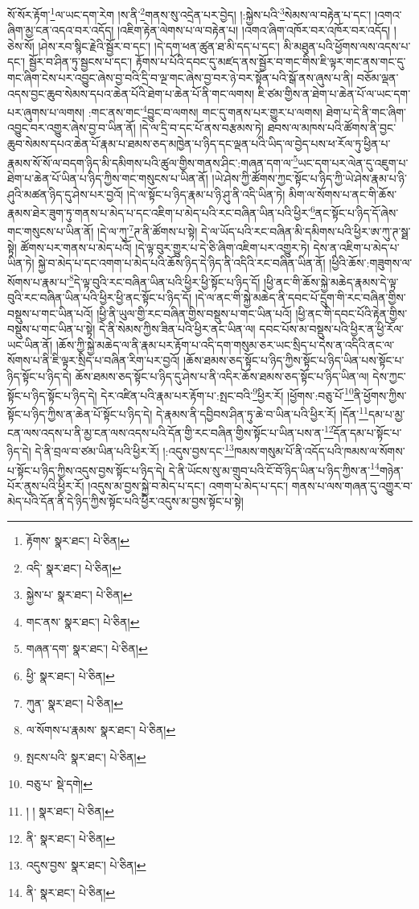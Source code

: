 སོ་སོར་རྟོག་\footnote{རྟོགས་  སྣར་ཐང་།  པེ་ཅིན། }ལ་ཡང་དག་རེག །ས་ནི་\footnote{འདི་  སྣར་ཐང་།  པེ་ཅིན། }གནས་སུ་འདྲེན་པར་བྱེད། །:སྐྱེས་པའི་\footnote{སྐྱེས་པ་  སྣར་ཐང་།  པེ་ཅིན། }སེམས་ལ་བརྟེན་པ་དང་། །འགའ་ཞིག་མྱ་ངན་འདའ་བར་འདོད། །འཇིག་རྟེན་ལེགས་པ་ལ་བརྟེན་པ། །འགའ་ཞིག་འཁོར་བར་འཁོར་བར་འདོད། །ཅེས་སོ། །ཤེས་རབ་སྙིང་རྗེའི་སྦྱོར་བ་དང་། །དེ་དག་ཕན་ཚུན་ཐ་མི་དད་པ་དང་། མི་མཐུན་པའི་ཕྱོགས་ལས་འདས་པ་དང་། སྦྱོར་བ་ཤིན་ཏུ་སྦྱངས་པ་དང་། རྟོགས་པ་པོའི་དབང་དུ་མཛད་ནས་སྦྱོར་བ་གང་གིས་ཇི་ལྟར་གང་ནས་གང་དུ་གང་ཞིག་ངེས་པར་འབྱུང་ཞེས་བྱ་བའི་དྲི་བ་ལྔ་གང་ཞེས་བྱ་བར་ཉེ་བར་སྟོན་པའི་སྒོ་ནས་ཞུས་པ་ནི། བཅོམ་ལྡན་འདས་བྱང་ཆུབ་སེམས་དཔའ་ཆེན་པོའི་ཐེག་པ་ཆེན་པོ་ནི་གང་ལགས། ཇི་ཙམ་གྱིས་ན་ཐེག་པ་ཆེན་པོ་ལ་ཡང་དག་པར་ཞུགས་པ་ལགས། :གང་ནས་གང་\footnote{གང་ནས་  སྣར་ཐང་།  པེ་ཅིན། }བྱུང་བ་ལགས། གང་དུ་གནས་པར་གྱུར་པ་ལགས། ཐེག་པ་དེ་ནི་གང་ཞིག་འབྱུང་བར་འགྱུར་ཞེས་བྱ་བ་ཡིན་ནོ། །དེ་ལ་དྲི་བ་དང་པོ་ནས་བརྩམས་ཏེ། ཐབས་ལ་མཁས་པའི་ཚོགས་ནི་བྱང་ཆུབ་སེམས་དཔའ་ཆེན་པོ་རྣམ་པ་ཐམས་ཅད་མཁྱེན་པ་ཉིད་དང་ལྡན་པའི་ཡིད་ལ་བྱེད་པས་ཕ་རོལ་ཏུ་ཕྱིན་པ་རྣམས་སོ་སོ་ལ་བདག་ཉིད་མི་དམིགས་པའི་ཚུལ་གྱིས་གནས་ཤིང་:གཞན་དག་ལ་\footnote{གཞན་དག་  སྣར་ཐང་།  པེ་ཅིན། }ཡང་དག་པར་ལེན་དུ་འཇུག་པ་ཐེག་པ་ཆེན་པོ་ཡིན་པ་ཉིད་ཀྱིས་གང་གསུངས་པ་ཡིན་ནོ། །ཡེ་ཤེས་ཀྱི་ཚོགས་ཀྱང་སྟོང་པ་ཉིད་ཀྱི་ཡེ་ཤེས་རྣམ་པ་ཉི་ཤུའི་མཚན་ཉིད་དུ་ཤེས་པར་བྱའོ། །དེ་ལ་སྟོང་པ་ཉིད་རྣམ་པ་ཉི་ཤུ་ནི་འདི་ཡིན་ཏེ། མིག་ལ་སོགས་པ་ནང་གི་ཆོས་རྣམས་ཐེར་ཟུག་ཏུ་གནས་པ་མེད་པ་དང་འཇིག་པ་མེད་པའི་རང་བཞིན་ཡིན་པའི་ཕྱིར་\footnote{ཕྱི་  སྣར་ཐང་།  པེ་ཅིན། }ནང་སྟོང་པ་ཉིད་དོ་ཞེས་གང་གསུངས་པ་ཡིན་ནོ། །དེ་ལ་ཀུ་\footnote{ཀུན་  སྣར་ཐང་།  པེ་ཅིན། }ཊ་ནི་ཚོགས་པ་སྟེ། དེ་ལ་ཡོད་པའི་རང་བཞིན་མི་དམིགས་པའི་ཕྱིར་ཨ་ཀུ་ཊ་སྠ་སྟེ། ཚོགས་པར་གནས་པ་མེད་པའོ། །དེ་ལྟ་བུར་གྱུར་པ་དེ་ཅི་ཞིག་འཇིག་པར་འགྱུར་ཏེ། དེས་ན་འཇིག་པ་མེད་པ་ཡིན་ཏེ། སྐྱེ་བ་མེད་པ་དང་འགག་པ་མེད་པའི་ཆོས་ཉིད་དེ་ཉིད་ནི་འདིའི་རང་བཞིན་ཡིན་ནོ། །ཕྱིའི་ཆོས་:གཟུགས་ལ་སོགས་པ་རྣམ་པ་\footnote{ལ་སོགས་པ་རྣམས་  སྣར་ཐང་།  པེ་ཅིན། }དེ་ལྟ་བུའི་རང་བཞིན་ཡིན་པའི་ཕྱིར་ཕྱི་སྟོང་པ་ཉིད་དོ། །ཕྱི་ནང་གི་ཆོས་སྐྱེ་མཆེད་རྣམས་དེ་ལྟ་བུའི་རང་བཞིན་ཡིན་པའི་ཕྱིར་ཕྱི་ནང་སྟོང་པ་ཉིད་དོ། །དེ་ལ་ནང་གི་སྐྱེ་མཆེད་ནི་དབང་པོ་དྲུག་གི་རང་བཞིན་གྱིས་བསྡུས་པ་གང་ཡིན་པའོ། །ཕྱི་ནི་ཡུལ་གྱི་རང་བཞིན་གྱིས་བསྡུས་པ་གང་ཡིན་པའོ། །ཕྱི་ནང་གི་དབང་པོའི་རྟེན་གྱིས་བསྡུས་པ་གང་ཡིན་པ་སྟེ། དེ་ནི་སེམས་ཀྱིས་ཟིན་པའི་ཕྱིར་ནང་ཡིན་ལ། དབང་པོས་མ་བསྡུས་པའི་ཕྱིར་ན་ཕྱི་རོལ་ཡང་ཡིན་ནོ། །ཆོས་ཀྱི་སྐྱེ་མཆེད་ལ་ནི་རྣམ་པར་རྟོག་པ་འདི་དག་གསུམ་ཅར་ཡང་སྲིད་པ་དེས་ན་འདིའི་ནང་ལ་སོགས་པ་ནི་ཇི་ལྟར་སྲིད་པ་བཞིན་རིག་པར་བྱའོ། །ཆོས་ཐམས་ཅད་སྟོང་པ་ཉིད་ཀྱིས་སྟོང་པ་ཉིད་ཡིན་པས་སྟོང་པ་ཉིད་སྟོང་པ་ཉིད་དེ། ཆོས་ཐམས་ཅད་སྟོང་པ་ཉིད་དུ་ཤེས་པ་ནི་འདིར་ཆོས་ཐམས་ཅད་སྟོང་པ་ཉིད་ཡིན་ལ། དེས་ཀྱང་སྟོང་པ་ཉིད་སྟོང་པ་ཉིད་དེ། དེར་འཛིན་པའི་རྣམ་པར་རྟོག་པ་:སྤང་བའི་\footnote{སྤངས་པའི་  སྣར་ཐང་།  པེ་ཅིན། }ཕྱིར་རོ། །ཕྱོགས་:བཅུ་པོ་\footnote{བཅུ་པ་  སྡེ་དགེ། }ནི་ཕྱོགས་ཀྱིས་སྟོང་པ་ཉིད་ཀྱིས་ན་ཆེན་པོ་སྟོང་པ་ཉིད་དེ། དེ་རྣམས་ནི་དབྱིབས་ཤིན་ཏུ་ཆེ་བ་ཡིན་པའི་ཕྱིར་རོ། །དོན་\footnote{། །  སྣར་ཐང་།  པེ་ཅིན། }དམ་པ་མྱ་ངན་ལས་འདས་པ་ནི་མྱ་ངན་ལས་འདས་པའི་དོན་གྱི་རང་བཞིན་གྱིས་སྟོང་པ་ཡིན་པས་ན་\footnote{ནི་  སྣར་ཐང་།  པེ་ཅིན། }དོན་དམ་པ་སྟོང་པ་ཉིད་དེ། དེ་ནི་བྲལ་བ་ཙམ་ཡིན་པའི་ཕྱིར་རོ། །:འདུས་བྱས་དང་\footnote{འདུས་བྱས་  སྣར་ཐང་།  པེ་ཅིན། }ཁམས་གསུམ་པོ་ནི་འདོད་པའི་ཁམས་ལ་སོགས་པ་སྟོང་པ་ཉིད་ཀྱིས་འདུས་བྱས་སྟོང་པ་ཉིད་དེ། དེ་ནི་ཡོངས་སུ་མ་གྲུབ་པའི་ངོ་བོ་ཉིད་ཡིན་པ་ཉིད་ཀྱིས་ན་\footnote{ནི་  སྣར་ཐང་།  པེ་ཅིན། }གཉེན་པོར་ནུས་པའི་ཕྱིར་རོ། །འདུས་མ་བྱས་སྐྱེ་བ་མེད་པ་དང་། འགག་པ་མེད་པ་དང་། གནས་པ་ལས་གཞན་དུ་འགྱུར་བ་མེད་པའི་དོན་ནི་དེ་ཉིད་ཀྱིས་སྟོང་པའི་ཕྱིར་འདུས་མ་བྱས་སྟོང་པ་སྟེ། 